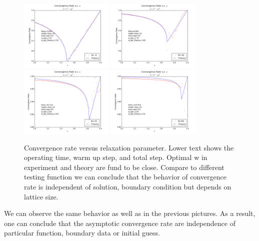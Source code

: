 \documentclass[12pt]{article}
\begin{document}
\begin{figure}[h!]
	\begin{center}
		\includegraphics[width=0.4\textwidth]{Conv_rate_N_8_2.png}
		\includegraphics[width=0.4\textwidth]{Conv_rate_N_16_2.png}
		\includegraphics[width=0.4\textwidth]{Conv_rate_N_32_2.png}
		\includegraphics[width=0.4\textwidth]{Conv_rate_N_64_2.png}
		\caption{Convergence rate versus relaxation parameter. Lower text shows the operating time, warm up step, and total step. Optimal w in experiment and theory are fund to be close. Compare to different testing function we can conclude that the behavior of convergence rate is independent of solution, boundary condition but depends on lattice size.}
		\label{fig3}
	\end{center}
\end{figure}

We can observe the same behavior as well as in the previous pictures. As a result, one can conclude that the asymptotic convergence rate are independence of particular function, boundary data or initial guess.
\end{document}
